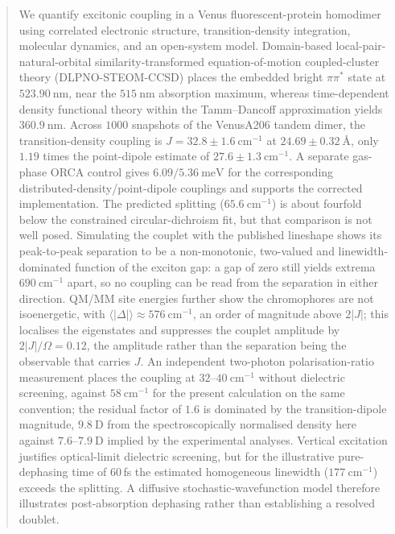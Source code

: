 \documentclass[journal=jpcbfk, manuscript=article, layout=twocolumn, doi=true]{achemso}
\begin{document}
\begin{abstract}
We quantify excitonic coupling in a Venus fluorescent-protein homodimer using correlated electronic structure, transition-density integration, molecular dynamics, and an open-system model. Domain-based local-pair-natural-orbital similarity-transformed equation-of-motion coupled-cluster theory (DLPNO-STEOM-CCSD) places the embedded bright $\pi\pi^{*}$ state at $523.90~\mathrm{nm}$, near the $515~\mathrm{nm}$ absorption maximum, whereas time-dependent density functional theory within the Tamm--Dancoff approximation yields $360.9~\mathrm{nm}$. Across $1000$ snapshots of the VenusA206 tandem dimer, the transition-density coupling is $J = 32.8 \pm 1.6~\mathrm{cm^{-1}}$ at $24.69 \pm 0.32~\text{\AA}$, only $1.19$ times the point-dipole estimate of $27.6 \pm 1.3~\mathrm{cm^{-1}}$. A separate gas-phase ORCA control gives $6.09/5.36~\mathrm{meV}$ for the corresponding distributed-density/point-dipole couplings and supports the corrected implementation. The predicted splitting ($65.6~\mathrm{cm^{-1}}$) is about fourfold below the constrained circular-dichroism fit, but that comparison is not well posed. Simulating the couplet with the published lineshape shows its peak-to-peak separation to be a non-monotonic, two-valued and linewidth-dominated function of the exciton gap: a gap of zero still yields extrema $690~\mathrm{cm^{-1}}$ apart, so no coupling can be read from the separation in either direction. QM/MM site energies further show the chromophores are not isoenergetic, with $\langle|\Delta|\rangle \approx 576~\mathrm{cm^{-1}}$, an order of magnitude above $2|J|$; this localises the eigenstates and suppresses the couplet amplitude by $2|J|/\Omega=0.12$, the amplitude rather than the separation being the observable that carries $J$. An independent two-photon polarisation-ratio measurement places the coupling at $32$--$40~\mathrm{cm^{-1}}$ without dielectric screening, against $58~\mathrm{cm^{-1}}$ for the present calculation on the same convention; the residual factor of $1.6$ is dominated by the transition-dipole magnitude, $9.8~\mathrm{D}$ from the spectroscopically normalised density here against $7.6$--$7.9~\mathrm{D}$ implied by the experimental analyses. Vertical excitation justifies optical-limit dielectric screening, but for the illustrative pure-dephasing time of $60$\,fs the estimated homogeneous linewidth ($177~\mathrm{cm^{-1}}$) exceeds the splitting. A diffusive stochastic-wavefunction model therefore illustrates post-absorption dephasing rather than establishing a resolved doublet.
\end{abstract}
\end{document}
